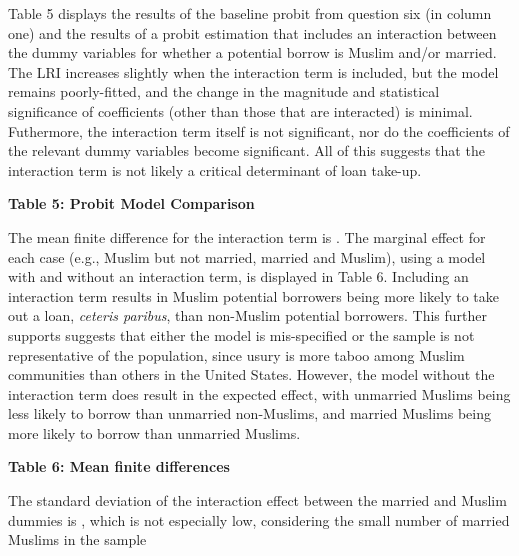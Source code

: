 \documentclass{article}
\begin{document}
Table 5 displays the results of the baseline probit from question six (in column one) and the results of a probit estimation that includes an interaction between the dummy variables for whether a potential borrow is Muslim and/or married. The LRI increases slightly when the interaction term is included, but the model remains poorly-fitted, and the change in the magnitude and statistical significance of coefficients (other than those that are interacted) is minimal. Futhermore, the interaction term itself is not significant, nor do the coefficients of the relevant dummy variables become significant. All of this suggests that the interaction term is not likely a critical determinant of loan take-up.
\begin{center}
        \textbf{Table 5: Probit Model Comparison} \\\medskip
{\footnotesize
        
}
\end{center}

The mean finite difference for the interaction term is . The marginal effect for each case (e.g., Muslim but not married, married and Muslim), using a model with and without an interaction term, is displayed in Table 6. Including an interaction term results in Muslim potential borrowers being more likely to take out a loan, \textit{ceteris paribus}, than non-Muslim potential borrowers. This further supports suggests that either the model is mis-specified or the sample is not representative of the population, since usury is more taboo among Muslim communities than others in the United States. However, the model without the interaction term does result in the expected effect, with unmarried Muslims being less likely to borrow than unmarried non-Muslims, and married Muslims being more likely to borrow than unmarried Muslims.
\begin{center}
        \textbf{Table 6: Mean finite differences} \\\medskip
        
\end{center}

The standard deviation of the interaction effect between the married and Muslim dummies is , which is not especially low, considering the small number of married Muslims in the sample\textemdash
\end{document}
